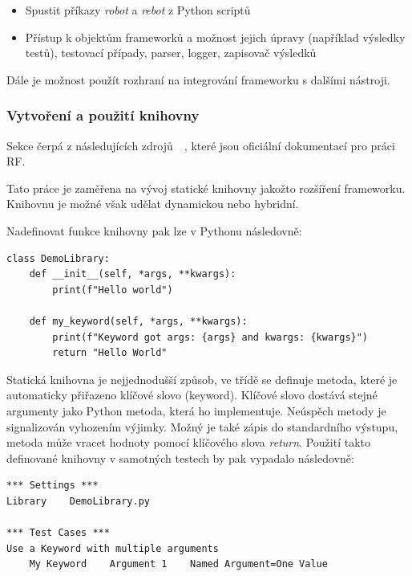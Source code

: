 \begin{itemize}
    \item Spustit příkazy \textit{robot} a \textit{rebot} z Python scriptů
    \item Přístup k objektům frameworků a možnost jejich úpravy (například výsledky testů), testovací případy, parser, logger, zapisovač výsledků
\end{itemize}

Dále je možnost použít rozhraní na integrování frameworku s dalšími nástroji.

\subsubsection{Vytvoření a použití knihovny}

Sekce čerpá z následujících zdrojů~\cite{robotframeworkUserGuide}~\cite{robotframeworkBaseLibrary}, které jsou oficiální dokumentací pro práci RF.

Tato práce je zaměřena na vývoj statické knihovny jakožto rozšíření frameworku. Knihovnu je možné však udělat dynamickou nebo hybridní.

Nadefinovat funkce knihovny pak lze v Pythonu následovně:

\begin{listing}[H]
    \begin{verbatim}
class DemoLibrary:
    def __init__(self, *args, **kwargs):
        print(f"Hello world")

    def my_keyword(self, *args, **kwargs):
        print(f"Keyword got args: {args} and kwargs: {kwargs}")
        return "Hello World"
    \end{verbatim}
    
    \caption{Definování knihovny~\cite{robotframeworkBaseLibrary}}
    \label{list:demo-library}
\end{listing}

Statická knihovna je nejjednodušší způsob, ve třídě se definuje metoda, které je automaticky přiřazeno klíčové slovo (keyword). Klíčové slovo dostává stejné argumenty jako Python metoda, která ho implementuje. Neúspěch metody je signalizován vyhozením výjimky. Možný je také zápis do standardního výstupu, metoda může vracet hodnoty pomocí klíčového slova \textit{return}.
Použití takto definované knihovny v samotných testech by pak vypadalo následovně:

\begin{listing}[H]
    \begin{verbatim}
*** Settings ***
Library    DemoLibrary.py

*** Test Cases ***
Use a Keyword with multiple arguments
    My Keyword    Argument 1    Named Argument=One Value
    \end{verbatim}

    \caption{Použití knihovny~\cite{robotframeworkBaseLibrary}}
    \label{list:demo-library-usage}
\end{listing}

